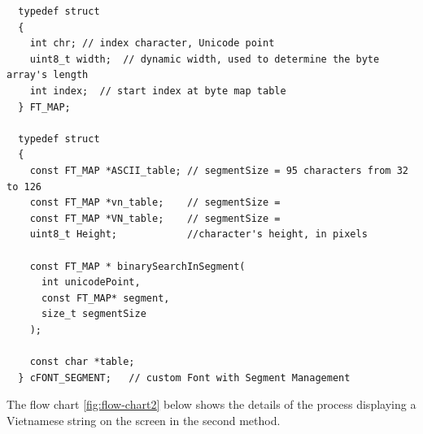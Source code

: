 \documentclass[../Main.tex]{subfiles}
\begin{document}
{\fontsize{8pt}{8pt}\selectfont 
    \begin{verbatim}
  typedef struct 
  {
    int chr; // index character, Unicode point
    uint8_t width;  // dynamic width, used to determine the byte array's length
    int index;  // start index at byte map table
  } FT_MAP;

  typedef struct
  {    
    const FT_MAP *ASCII_table; // segmentSize = 95 characters from 32 to 126
    const FT_MAP *vn_table;    // segmentSize = 
    const FT_MAP *VN_table;    // segmentSize = 
    uint8_t Height;            //character's height, in pixels
  
    const FT_MAP * binarySearchInSegment(
      int unicodePoint, 
      const FT_MAP* segment, 
      size_t segmentSize
    );
    
    const char *table;
  } cFONT_SEGMENT;   // custom Font with Segment Management
    \end{verbatim}
}

 The flow chart \ref{fig:flow-chart2} below shows the details of the process displaying a Vietnamese string on the screen in the second method.
\end{document}
